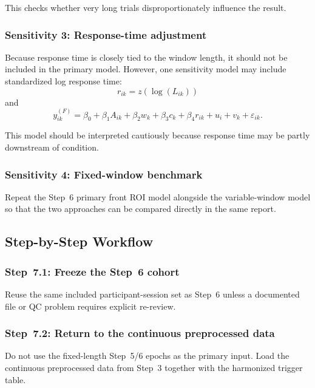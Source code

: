 This checks whether very long trials disproportionately influence the result.

\subsubsection{Sensitivity 3: Response-time adjustment}
Because response time is closely tied to the window length, it should not be included in the primary model.
However, one sensitivity model may include standardized log response time:
\begin{equation}
r_{ik} = z\!\left(\log(L_{ik})\right)
\end{equation}
and
\begin{equation}
y^{(F)}_{ik}
=
\beta_0
+
\beta_1 A_{ik}
+
\beta_2 w_k
+
\beta_3 c_k
+
\beta_4 r_{ik}
+
u_i
+
v_k
+
\varepsilon_{ik}.
\end{equation}

This model should be interpreted cautiously because response time may be partly downstream of condition.

\subsubsection{Sensitivity 4: Fixed-window benchmark}
Repeat the Step~6 primary front ROI model alongside the variable-window model so that the two
approaches can be compared directly in the same report.

\subsection{Step-by-Step Workflow}

\subsubsection{Step~7.1: Freeze the Step~6 cohort}
Reuse the same included participant-session set as Step~6 unless a documented file or QC problem
requires explicit re-review.

\subsubsection{Step~7.2: Return to the continuous preprocessed data}
Do not use the fixed-length Step~5/6 epochs as the primary input.
Load the continuous preprocessed data from Step~3 together with the harmonized trigger table.

